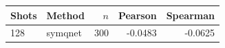 \begin{tabular}{llrrr}
\toprule
Shots & Method & $n$ & Pearson & Spearman \\
\midrule
128 & symqnet & 300 & -0.0483 & -0.0625 \\
\bottomrule
\end{tabular}
